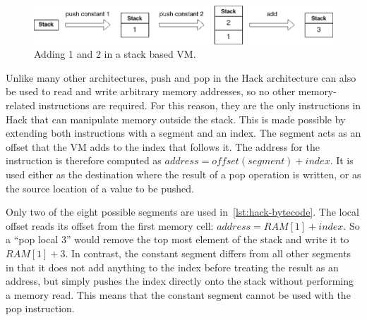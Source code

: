 \begin{center}
  \begin{figure}[ht]
    \centering
    \includegraphics[width=14cm]{fig/stack-add.png}
    \caption{Adding 1 and 2 in a stack based VM.}
    \label{fig:stack-add}
  \end{figure}
\end{center}

Unlike many other architectures, push and pop in the Hack architecture can also be used to read and write arbitrary memory addresses, so no other memory-related instructions are required. For this reason, they are the only instructions in Hack that can manipulate memory outside the stack.
This is made possible by extending both instructions with a segment and an index. The segment acts as an offset that the VM adds to the index that follows it.
The address for the instruction is therefore computed as \(address=offset(segment)+index\).
It is used either as the destination where the result of a pop operation is written, or as the source location of a value to be pushed.

Only two of the eight possible segments are used in~\cref{lst:hack-bytecode}.
The local offset reads its offset from the first memory cell: \(address=RAM[1]+index\). So a ``pop local 3'' would remove the top most element of the stack and write it to \(RAM[1]+3\).
In contrast, the constant segment differs from all other segments in that it does not add anything to the index before treating the result as an address, but simply pushes the index directly onto the stack without performing a memory read.
This means that the constant segment cannot be used with the pop instruction.

